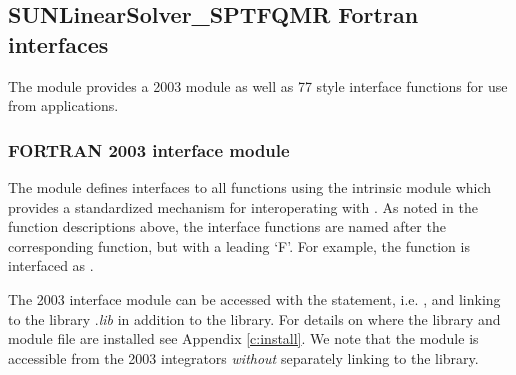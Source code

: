 \subsection{SUNLinearSolver\_SPTFQMR Fortran interfaces}
\label{ss:sunlinsol_sptfqmr_fortran}

The {\sunlinsolspfgmr} module provides a {\F} 2003 module as well as {\F} 77
style interface functions for use from {\F} applications.

\subsubsection*{FORTRAN 2003 interface module}
The  {\F} module defines interfaces to all
{\sunlinsolspfgmr} {\CC} functions using the intrinsic 
module which provides a standardized mechanism for interoperating with {\CC}. As
noted in the {\CC} function descriptions above, the interface functions are
named after the corresponding {\CC} function, but with a leading `F'. For
example, the function  is interfaced as
.

The {\F} 2003 {\sunlinsolspfgmr} interface module can be accessed with the 
statement, i.e. , and linking to the library
.{\em lib} in addition to the {\CC} library.
For details on where the library and module file \newline
{} are installed see Appendix \ref{c:install}.
We note that the module is accessible from the {\F} 2003 {\sundials} integrators
\textit{without} separately linking to the \newline
{} library.

